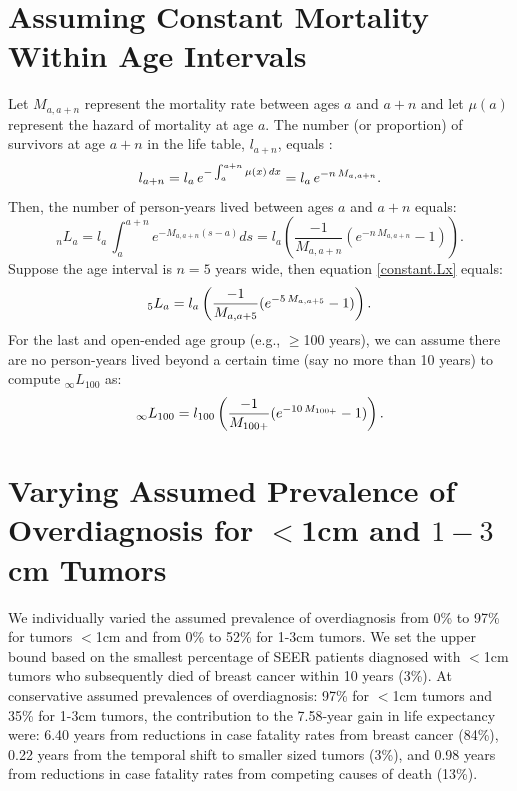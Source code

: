\documentclass[11pt,letterpaper]{article}
\theoremstyle{plain}
\begin{document}
\section{Assuming Constant Mortality Within Age Intervals}
Let $M_{a,a+n}$ represent the mortality rate between ages $a$ and
$a+n$ and let $\mu(a)$ represent the hazard of mortality at age
$a$.  The number (or proportion) of survivors at age $a+n$ in the
life table, $l_{a+n}$, equals \cite{PreHeuGui00}:
\begin{equation}
l_{a+n}=l_{a}\,e^{-\int_a^{a+n}\mu(x)\,dx}=l_{a}\,e^{-n\,M_{a,a+n}}.\notag
\end{equation}
Then, the number of person-years lived between ages $a$ and $a+n$ equals:
\begin{equation}
_nL_{a}=l_a\,\int_a^{a+n} e^{-M_{a,a+n}(s-a)} ds=l_a \left(\frac{-1}{M_{a,a+n}}(e^{-n\,M_{a,a+n}}-1) \right).
\label{constant.Lx}
\end{equation}
Suppose the age interval is $n=5$ years wide, then equation \eqref{constant.Lx}
equals:
\begin{equation}
_5L_{a}=l_a \left(\frac{-1}{M_{a,a+5}}(e^{-5\,M_{a,a+5}}-1) \right).\notag
\end{equation}
For the last and open-ended age group (e.g., $\geq$100 years), we can assume there
are no person-years lived beyond a certain time (say no more than 10
years) to compute $_{\infty}L_{100}$ as:
\begin{equation}
_{\infty}L_{100}=l_{100} \left(\frac{-1}{M_{100+}}(e^{-10\,M_{100+}}-1) \right).\notag
\end{equation}

\newpage
\section{Varying Assumed Prevalence of Overdiagnosis for $<$1cm and $1-3$cm Tumors}
We individually varied the assumed prevalence of overdiagnosis from
0\% to 97\% for tumors $<$1cm and from 0\% to 52\% for 1-3cm tumors.
We set the upper bound based on the smallest percentage of SEER
patients diagnosed with $<$1cm tumors who subsequently died of breast
cancer within 10 years (3\%).  At conservative assumed
prevalences of overdiagnosis: 97\% for $<$1cm tumors and 35\% for
1-3cm tumors, the contribution to the 7.58-year gain in life
expectancy were: 6.40 years from reductions in case fatality rates
from breast cancer (84\%), 0.22 years from the temporal shift to
smaller sized tumors (3\%), and 0.98 years from reductions in case
fatality rates from competing causes of death (13\%).
\end{document}
